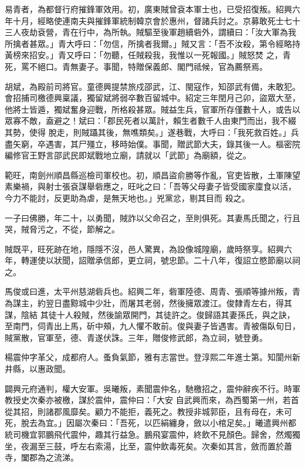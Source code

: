 \begin{pinyinscope}
 易青者，為都督行府摧鋒軍效用。初，廣東賊曾袞本軍士也，已受招復叛。紹興六年十月，經略使連南夫與摧鋒軍統制韓京會於惠州，督諸兵討之。京募敢死士七十三人夜劫袞營，青在行中，為所執。賊驅至後軍趙續砦外，謂續曰：「汝大軍為我所擒者甚眾。」青大呼曰：「勿信，所擒者我爾。」賊又言：「吾不汝殺，第令經略持黃榜來招安。」青又呼曰：「勿聽，任賊殺我，我惟以一死報國。」賊怒焚
 之，青死，罵不絕口。青無妻子。事聞，特贈保義郎、閣門祗候，官為薦祭焉。



 胡斌，為殿前司將官。童德興提禁旅戍邵武，江、閩寇作，知邵武有備，未敢犯。會招捕司檄德興稟議，獨留斌將弱卒數百留城中。紹定三年閏月己卯，盜眾大至，他將士皆遁，獨斌奮身迎戰，所格殺甚眾。賊益生兵，官軍所存僅數十人，或告以眾寡不敵，盍避之！斌曰：「郡民死者以萬計，賴生者數千人由東門而出，我不綴其勢，使得
 脫走，則賊躡其後，無噍類矣。」遂巷戰，大呼曰：「我死救百姓。」兵盡矢窮，卒遇害，其尸殭立，移時始僕。事聞，贈武節大夫，錄其後一人。樞密院編修官王野言邵武民即斌戰地立廟，請就以「武節」為廟額，從之。



 範旺，南劍州順昌縣巡檢司軍校也。初，順昌盜俞勝等作亂，官吏皆散，土軍陳望素樂禍，與射士張袞謀舉砦應之，旺叱之曰：「吾等父母妻子皆受國家廩食以活，今力不能討，反更助為虐，是無天地也。」兇黨忿，剔其目而
 殺之。



 一子曰佛勝，年二十，以勇聞，賊詐以父命召之，至則俱死。其妻馬氏聞之，行且哭，賊脅污之，不從，節解之。



 賊既平，旺死跡在地，隱隱不沒，邑人驚異，為設像城隍廟，歲時祭享。紹興六年，轉運使以狀聞，詔贈承信郎，更立祠，號忠節。二十八年，復詔立愍節廟以祠之。



 馬俊或曰進，太平州慈湖砦兵也。紹興二年，砦軍陸德、周青、張順等據州叛，青為謀主，約翌日盡黥城中少壯，而屠其老弱，然後擁眾渡江。俊隸青左右，得其謀，陰結
 其徒十人殺賊，然後諭眾開門，其徒許之。俊歸語其妻孫氏，與之訣，至南門，伺青出上馬，斫中頰，九人懼不敢前。俊與妻子皆遇害。青被傷臥旬日，賊黨散，官軍至，德、青遂伏誅。三年，贈俊修武郎，為立祠，號登勇。



 楊震仲字革父，成都府人。蚤負氣節，雅有志當世。登淳熙二年進士第。知閬州新井縣，以惠政聞。



 闢興元府通判，權大安軍。吳曦叛，素聞震仲名，馳檄招之，震仲辭疾不行。時軍教授史次秦亦被檄，謀於震仲，震仲曰：「大安
 自武興而來，為西蜀第一州，若首從其招，則諸郡風靡矣。顧力不能拒，義死之。教授非城郭臣，且有母在，未可死，脫去為宜。」因屬次秦曰：「吾死，以匹絹纏身，斂以小棺足矣。」曦遣興州都統司機宜郭鵬飛代震仲，趣其行益急。鵬飛宴震仲，終飲不見顏色。歸舍，然燭獨坐，夜漏至三鼓，呼左右索湯，比至，震仲飲毒死矣。次秦如其言，斂而置於蕭寺，闔郡為之流涕。




\end{pinyinscope}
